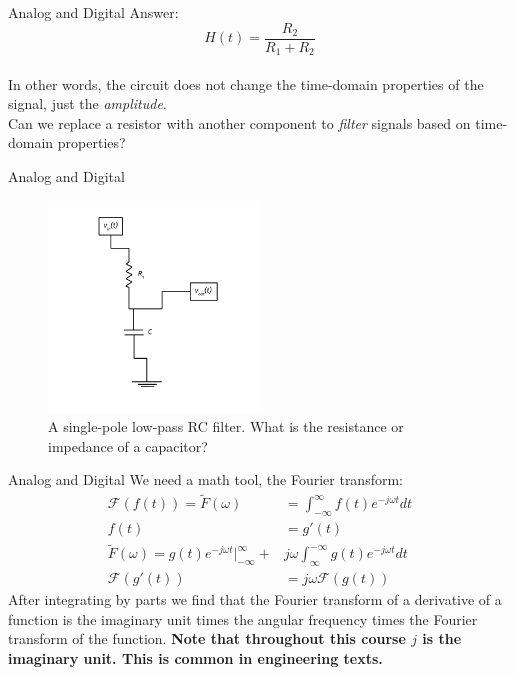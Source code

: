 \documentclass{beamer}
\begin{document}
\begin{frame}{Analog and Digital}
Answer:
\begin{equation}
H(t) = \frac{R_2}{R_1+R_2}
\end{equation} \\
\vspace{0.5cm}
In other words, the circuit does not change the time-domain properties of the signal, just the \textit{amplitude}. \\ \vspace{0.5cm}
Can we replace a resistor with another component to \textit{filter} signals based on time-domain properties?
\end{frame}

\begin{frame}{Analog and Digital}
\begin{figure}
\centering
\includegraphics[width=0.5\textwidth]{AnalogExample/LowPass.pdf}
\caption{\label{fig:example2} A single-pole low-pass RC filter.  What is the resistance or impedance of a capacitor?}
\end{figure}
\end{frame}

\begin{frame}{Analog and Digital}
We need a math tool, the Fourier transform:
\begin{align}
\mathcal{F}(f(t)) = \tilde{F}(\omega) &= \int_{-\infty}^{\infty} f(t) e^{-j\omega t} dt \label{eq:eq1} \\
f(t) &= g'(t) \label{eq:eq2} \\
\tilde{F}(\omega) = g(t) e^{-j\omega t} |_{-\infty}^{\infty} + &j\omega \int_{\infty}^{-\infty} g(t)  e^{-j\omega t} dt \label{eq:eq3} \\
\mathcal{F}(g'(t)) &= j\omega\mathcal{F}(g(t)) \label{eq:eq4}
\end{align}
After integrating by parts we find that the Fourier transform of a derivative of a function is the imaginary unit times the angular frequency times the Fourier transform of the function.  \textbf{Note that throughout this course $j$ is the imaginary unit.  This is common in engineering texts.}
\end{frame}
\end{document}
